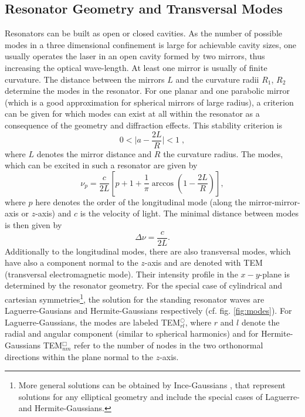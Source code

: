 \documentclass[a4paper]{scrartcl}
\numberwithin{equation}{section}
\numberwithin{figure}{section}
\numberwithin{table}{section}
\newcommand{\eq}[2]{\begin{equation}#1\label{#2}\end{equation}}
\begin{document}
\subsection{Resonator Geometry and Transversal Modes}
Resonators can be built as open or closed cavities. As the number of possible modes in a three dimensional confinement is large for achievable cavity sizes, one usually operates the laser in an open cavity formed by two mirrors, thus increasing the optical wave-length. At least one mirror is usually of finite curvature. The distance between the mirrors $L$ and the curvature radii $R_1$, $R_2$ determine the modes in the resonator. For one planar and one parabolic mirror (which is a good approximation for spherical mirrors of large radius), a criterion can be given for which modes can exist at all within the resonator as a consequence of the geometry and diffraction effects. This stability criterion is
\eq{ 0 < \lvert a- \frac{2L}{R} \rvert <1 \; ,}{stability}
where $L$ denotes the mirror distance and $R$ the curvature radius. The modes, which can be excited in such a resonator are given by 
\eq{\nu_p = \frac{c}{2L} \left[ p+1+\frac{1}{\pi}\arccos \left( 1-\frac{2L}{R}\right) \right] , } {modes}
where $p$ here denotes the order of the longitudinal mode (along the mirror-mirror-axis or $z$-axis) and $c$ is the velocity of light. The minimal distance between modes is then given by
\eq{\Delta \nu = \frac{c}{2L} .}{}
Additionally to the longitudinal modes, there are also transversal modes, which have also a component normal to the $z$-axis and are denoted with TEM (transversal electromagnetic mode). Their intensity profile in the $x-y$-plane is determined by the resonator geometry. For the special case of cylindrical and cartesian symmetries\footnote{More general solutions can be obtained by Ince-Gaussians \cite{ince}, that represent solutions for any elliptical geometry and include the special cases of Laguerre- and Hermite-Gaussians.}, the solution for the standing resonator waves are Laguerre-Gausians and Hermite-Gaussians respectively (cf.  fig. \ref{fig:modes}). For Laguerre-Gaussians, the modes are labeled TEM$^\bigcirc_{rl}$, where $r$ and $l$ denote the radial and angular component (similar to spherical harmonics) and for Hermite-Gaussians TEM$^\Box_{nm}$ refer to the number of nodes in the two orthonormal directions within the plane normal to the $z$-axis.
\end{document}
